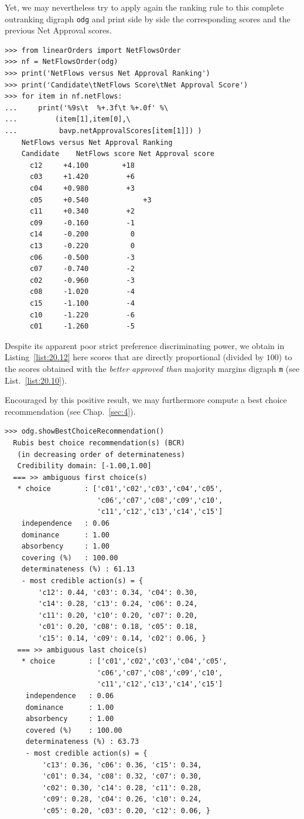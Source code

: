 Yet, we may nevertheless try to apply again the \NetFlows ranking rule to this complete outranking digraph \texttt{odg} and print side by side the corresponding \NetFlows scores and the previous Net Approval scores. 
\begin{lstlisting}[caption={Comparing the \NetFlows and the Net Approval rankings},label=list:20.12]
>>> from linearOrders import NetFlowsOrder
>>> nf = NetFlowsOrder(odg)
>>> print('NetFlows versus Net Approval Ranking')
>>> print('Candidate\tNetFlows Score\tNet Approval Score')
>>> for item in nf.netFlows:
...     print('%9s\t  %+.3f\t %+.0f' %\
...         (item[1],item[0],\
...          bavp.netApprovalScores[item[1]]) )  
    NetFlows versus Net Approval Ranking
    Candidate    NetFlows score	Net Approval score
      c12	  +4.100	    +18
      c03	  +1.420	     +6
      c04	  +0.980	     +3
      c05	  +0.540             +3
      c11	  +0.340	     +2
      c09	  -0.160	     -1
      c14	  -0.200	      0
      c13	  -0.220	      0
      c06	  -0.500	     -3
      c07	  -0.740	     -2
      c02	  -0.960	     -3
      c08	  -1.020	     -4
      c15	  -1.100	     -4
      c10	  -1.220	     -6
      c01	  -1.260	     -5
\end{lstlisting}

Despite its apparent poor strict preference discriminating power, we obtain in Listing~\vref{list:20.12} here \NetFlows scores that are directly proportional (divided by $100$) to the scores obtained with the \emph{better approved than} majority margins digraph \texttt{m} (see List.~\vref{list:20.10}).

Encouraged by this positive result, we may furthermore compute a \Rubis best choice recommendation (see Chap.~\ref{sec:4}).
\begin{lstlisting}[caption={Computing a best social choice recommendation},label=list:20.13]
>>> odg.showBestChoiceRecommendation()
  Rubis best choice recommendation(s) (BCR)
   (in decreasing order of determinateness)   
   Credibility domain: [-1.00,1.00]
  === >> ambiguous first choice(s) 
   * choice        : ['c01','c02','c03','c04','c05',
                      'c06','c07','c08','c09','c10',
                      'c11','c12','c13','c14','c15']
    independence   : 0.06
    dominance      : 1.00
    absorbency     : 1.00
    covering (%)   : 100.00
    determinateness (%) : 61.13
    - most credible action(s) = {
        'c12': 0.44, 'c03': 0.34, 'c04': 0.30,
        'c14': 0.28, 'c13': 0.24, 'c06': 0.24,
        'c11': 0.20, 'c10': 0.20, 'c07': 0.20,
        'c01': 0.20, 'c08': 0.18, 'c05': 0.18,
        'c15': 0.14, 'c09': 0.14, 'c02': 0.06, }
   === >> ambiguous last choice(s)
    * choice        : ['c01','c02','c03','c04','c05',
                      'c06','c07','c08','c09','c10',
                      'c11','c12','c13','c14','c15']
     independence   : 0.06
     dominance      : 1.00
     absorbency     : 1.00
     covered (%)    : 100.00
     determinateness (%) : 63.73
     - most credible action(s) = {
         'c13': 0.36, 'c06': 0.36, 'c15': 0.34,
         'c01': 0.34, 'c08': 0.32, 'c07': 0.30,
         'c02': 0.30, 'c14': 0.28, 'c11': 0.28,
         'c09': 0.28, 'c04': 0.26, 'c10': 0.24,
         'c05': 0.20, 'c03': 0.20, 'c12': 0.06, }
\end{lstlisting}

